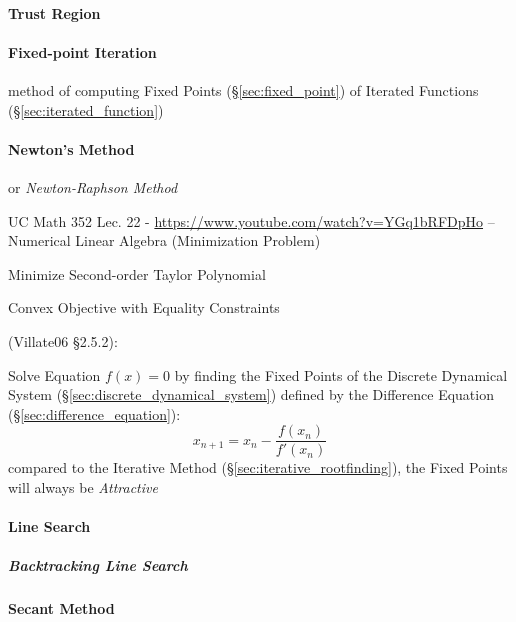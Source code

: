\paragraph{Trust Region}\label{sec:trust_region}\hfill

\paragraph{Fixed-point Iteration}\label{sec:fixedpoint_iteration}\hfill

method of computing Fixed Points (\S\ref{sec:fixed_point}) of Iterated Functions
(\S\ref{sec:iterated_function})



\paragraph{Newton's Method}\label{sec:newtons_method}\hfill

or \emph{Newton-Raphson Method}

UC Math 352 Lec. 22 - \url{https://www.youtube.com/watch?v=YGq1bRFDpHo} --
Numerical Linear Algebra (Minimization Problem)

Minimize Second-order Taylor Polynomial

Convex Objective with Equality Constraints

(Villate06 \S 2.5.2):

Solve Equation $f(x) = 0$ by finding the Fixed Points of the Discrete Dynamical
System (\S\ref{sec:discrete_dynamical_system}) defined by the Difference
Equation (\S\ref{sec:difference_equation}):
\[
  x_{n+1} = x_n - \frac{f(x_n)}{f'(x_n)}
\]
compared to the Iterative Method (\S\ref{sec:iterative_rootfinding}), the Fixed
Points will always be \emph{Attractive}



\paragraph{Line Search}\label{sec:line_search}\hfill

\subparagraph{Backtracking Line Search}\label{sec:backtracking_line_search}
\hfill



\paragraph{Secant Method}\label{sec:secant_method}\hfill

